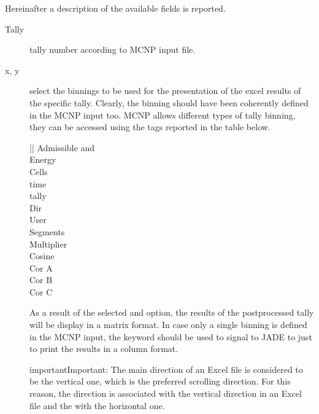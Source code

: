 \documentclass[letterpaper,10pt,english]{sphinxmanual}
\begin{document}
Hereinafter a description of the available fields is reported.
\begin{description}
\item[{Tally}] \leavevmode
tally number according to MCNP input file.

\item[{x, y}] \leavevmode
select the binnings to be used for the presentation of the excel results of the specific tally. Clearly,
the binning should have been coherently defined in the MCNP input too. MCNP allows different types of tally binning,
they can be accessed using the tags reported in the table below.


\begin{savenotes}\sphinxattablestart
\centering
{}
\sphinxthecaptionisattop
{}\label{\detokenize{usage/configuration:id1}}
\sphinxaftertopcaption
\begin{tabular}[t]{||}
\hline
\sphinxstyletheadfamily 
Admissible  and 
\\
\hline
Energy
\\
\hline
Cells
\\
\hline
time
\\
\hline
tally
\\
\hline
Dir
\\
\hline
User
\\
\hline
Segments
\\
\hline
Multiplier
\\
\hline
Cosine
\\
\hline
Cor A
\\
\hline
Cor B
\\
\hline
Cor C
\\
\hline
\end{tabular}
\par
\sphinxattableend\end{savenotes}

As a result of the selected  and  option, the results of the post\sphinxhyphen{}processed tally will be display in a
matrix format. In case only a single binning is defined in the MCNP input, the  keyword should be used to
signal to JADE to just to print the results in a column format.

\begin{sphinxadmonition}{important}{Important:}
The main direction of an Excel file is considered to be the vertical one, which is the preferred scrolling direction.
For this reason, the  direction is associated with the vertical direction in an Excel file and the  with
the horizontal one.
\end{sphinxadmonition}


\end{description}
\end{document}
